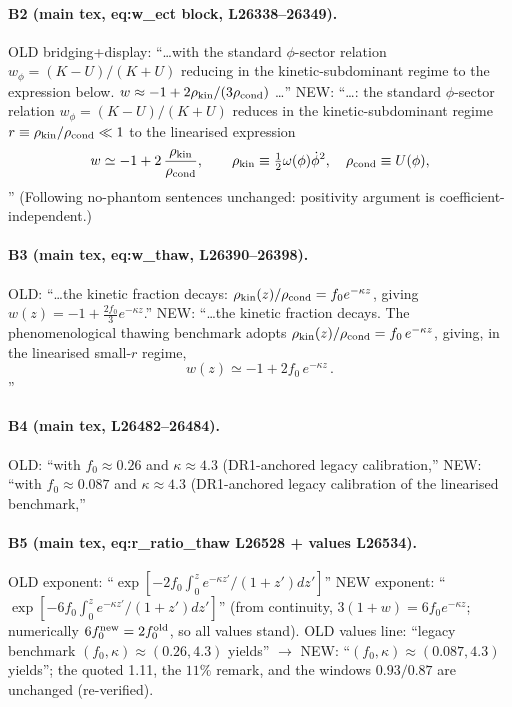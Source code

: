 \paragraph{B2 (main tex, eq:w\_ect block, L26338--26349).}
OLD bridging+display: ``\ldots with the standard $\phi$-sector
relation $w_\phi=(K-U)/(K+U)$ reducing in the
kinetic-subdominant regime to the expression below.
$w\approx-1+2\rho_{\rm kin}/(3\rho_{\rm cond})$ \ldots''
NEW: ``\ldots: the standard $\phi$-sector relation
$w_\phi=(K-U)/(K+U)$ reduces in the kinetic-subdominant regime
$r\equiv\rho_{\rm kin}/\rho_{\rm cond}\ll1$ to the linearised
expression
\begin{equation}
w \simeq -1 + 2\,\frac{\rho_{\rm kin}}{\rho_{\rm cond}}, \qquad
\rho_{\rm kin}\equiv\tfrac12\omega(\phi)\dot\phi^2,\quad
\rho_{\rm cond}\equiv U(\phi),
\label{eq:w\_ect}
\end{equation}''
(Following no-phantom sentences unchanged: positivity argument
is coefficient-independent.)

\paragraph{B3 (main tex, eq:w\_thaw, L26390--26398).}
OLD: ``\ldots the kinetic fraction decays:
$\rho_{\rm kin}(z)/\rho_{\rm cond}=f_0e^{-\kappa z}$, giving
$w(z)=-1+\frac{2f_0}{3}e^{-\kappa z}$.''
NEW: ``\ldots the kinetic fraction decays. The phenomenological
thawing benchmark adopts
$\rho_{\rm kin}(z)/\rho_{\rm cond}=f_0\,e^{-\kappa z}$, giving,
in the linearised small-$r$ regime,
\begin{equation}
w(z) \simeq -1 + 2 f_0\, e^{-\kappa z}\,.
\label{eq:w\_thaw}
\end{equation}''

\paragraph{B4 (main tex, L26482--26484).}
OLD: ``with $f_0\approx0.26$ and $\kappa\approx4.3$
(DR1-anchored legacy calibration,''
NEW: ``with $f_0\approx0.087$ and $\kappa\approx4.3$
(DR1-anchored legacy calibration of the linearised benchmark,''

\paragraph{B5 (main tex, eq:r\_ratio\_thaw L26528 + values
L26534).}
OLD exponent: ``$\exp[-2f_0\int_0^z e^{-\kappa z'}/(1+z')dz']$''
NEW exponent: ``$\exp[-6f_0\int_0^z e^{-\kappa z'}/(1+z')dz']$''
(from continuity, $3(1+w)=6f_0e^{-\kappa z}$; numerically
$6f_0^{\rm new}=2f_0^{\rm old}$, so all values stand).
OLD values line: ``legacy benchmark
$(f_0,\kappa)\approx(0.26,4.3)$ yields'' $\to$ NEW:
``$(f_0,\kappa)\approx(0.087,4.3)$ yields''; the quoted 1.11,
the $11\%$ remark, and the windows $0.93/0.87$ are unchanged
(re-verified).

